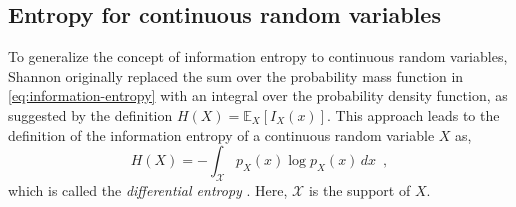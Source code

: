 \subsection{Entropy for continuous random variables}

To generalize the concept of information entropy to continuous random variables, Shannon originally replaced the sum over the probability mass function in \eqref{eq:information-entropy} with an integral over the probability density function, as suggested by the definition $H(X) = \mathbb{E}_X\left[I_X(x)\right]$. This approach leads to the definition of the information entropy of a continuous random variable $X$ as, 
%
\begin{equation} \label{eq:differential-entropy}
    H(X) = - \int_{\mathcal{X}} p_X(x) \log p_X(x) \, dx \enspace ,
\end{equation}
%
which is called the \emph{differential entropy} \parencite{shannon_mathematical_1948}. Here, $\mathcal{X}$ is the support of $X$. 

